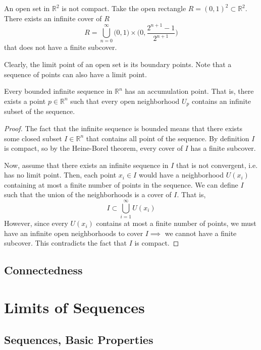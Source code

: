 \documentclass{article}
\begin{document}
    \begin{example}
      An open set in $\mathbb{R}^2$ is not compact. Take the open rectangle $ R = (0,1)^2 \subset \mathbb{R}^2$. There exists an infinite cover of $R$
      \[R = \bigcup_{n=0}^\infty \big(0,1\big) \times \bigg( 0, \frac{ 2^{n+1} - 1}{2^{n+1}} \bigg) \]
      that does not have a finite subcover. 
    \end{example}

    Clearly, the limit point of an open set is its boundary points. Note that a sequence of points can also have a limit point. 

    \begin{theorem}
      Every bounded infinite sequence in $\mathbb{R}^n$ has an accumulation point. That is, there exists a point $p \in \mathbb{R}^n$ such that every open neighborhood $U_p$ contains an infinite subset of the sequence. 
    \end{theorem}
    \begin{proof}
      The fact that the infinite sequence is bounded means that there exists some closed subset $I \in \mathbb{R}^n$ that contains all point of the sequence. By definition $I$ is compact, so by the Heine-Borel theorem, every cover of $I$ has a finite subcover. 

      Now, assume that there exists an infinite sequence in $I$ that is not convergent, i.e. has no limit point. Then, each point $x_i \in I$ would have a neighborhood $U(x_i)$ containing at most a finite number of points in the sequence. We can define $I$ such that the union of the neighborhoods is a cover of $I$. That is, 
      \[I \subset \bigcup_{i=1}^\infty U(x_i)\]
      However, since every $U(x_i)$ contains at most a finite number of points, we must have an infinite open neighborhoods to cover $I \implies$ we cannot have a finite subcover. This contradicts the fact that $I$ is compact. 
    \end{proof}

  \subsection{Connectedness}

\section{Limits of Sequences}

  \subsection{Sequences, Basic Properties}
\end{document}
